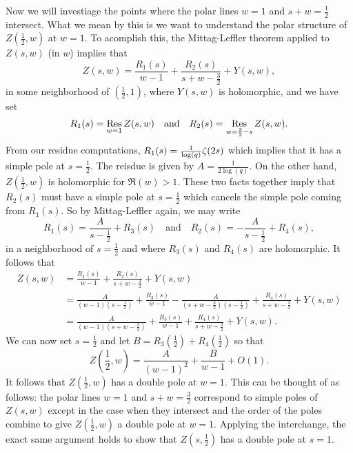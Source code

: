 \documentclass[12pt,reqno,oneside]{amsart}
\begin{document}
    Now we will investiage the points where the polar lines $w = 1$ and $s+w = \frac{1}{2}$ intersect. What we mean by this is we want to understand the polar structure of $Z\left(\frac{1}{2},w\right)$ at $w = 1$. To acomplish this, the Mittag-Leffler theorem applied to $Z(s,w)$ (in $w$) implies that
    \[
        Z(s,w) = \frac{R_{1}(s)}{w-1}+\frac{R_{2}(s)}{s+w-\frac{3}{2}}+Y(s,w),
    \]
    in some neighborhood of $\left(\frac{1}{2},1\right)$, where $Y(s,w)$ is holomorphic, and we have set
    \[
        R_{1}(s) = \operatorname*{\mathrm{Res}}_{w = 1}Z(s,w) \quad \text{and} \quad R_{2}(s) = \operatorname*{\mathrm{Res}}_{w = \frac{3}{2}-s}Z(s,w).
    \]
    From our residue computations, $R_{1}(s) = \frac{1}{\log(q)}\zeta(2s)$ which implies that it has a simple pole at $s = \frac{1}{2}$. The reisdue is given by $A = \frac{1}{2\log(q)}$. On the other hand, $Z\left(\frac{1}{2},w\right)$ is holomorphic for $\Re(w) > 1$. These two facts together imply that $R_{2}(s)$ must have a simple pole at $s = \frac{1}{2}$ which cancels the simple pole coming from $R_{1}(s)$. So by Mittag-Leffler again, we may write
    \[
        R_{1}(s) = \frac{A}{s-\frac{1}{2}}+R_{3}(s) \quad \text{and} \quad R_{2}(s) = -\frac{A}{s-\frac{1}{2}}+R_{4}(s),
    \]
    in a neighborhood of $s = \frac{1}{2}$ and where $R_{3}(s)$ and $R_{4}(s)$ are holomorphic. It follows that
    \begin{align*}
        Z(s,w) &= \frac{R_{1}(s)}{w-1}+\frac{R_{2}(s)}{s+w-\frac{3}{2}}+Y(s,w) \\ 
        &= \frac{A}{(w-1)\left(s-\frac{1}{2}\right)}+\frac{R_{3}(s)}{w-1}-\frac{A}{\left(s+w-\frac{3}{2}\right)\left(s-\frac{1}{2}\right)}+\frac{R_{4}(s)}{s+w-\frac{3}{2}}+Y(s,w) \\
        &= \frac{A}{(w-1)\left(s+w-\frac{3}{2}\right)}+\frac{R_{3}(s)}{w-1}+\frac{R_{4}(s)}{s+w-\frac{3}{2}}+Y(s,w).
    \end{align*}
    We can now set $s = \frac{1}{2}$ and let $B = R_{3}\left(\frac{1}{2}\right)+R_{4}\left(\frac{1}{2}\right)$ so that
    \[
        Z\left(\frac{1}{2},w\right) = \frac{A}{(w-1)^{2}}+\frac{B}{w-1}+O(1).
    \]
    It follows that $Z\left(\frac{1}{2},w\right)$ has a double pole at $w = 1$. This can be thought of as follows: the polar lines $w = 1$ and $s+w = \frac{3}{2}$ correspond to simple poles of $Z(s,w)$ except in the case when they intersect and the order of the poles combine to give $Z\left(\frac{1}{2},w\right)$ a double pole at $w = 1$. Applying the interchange, the exact same argument holds to show that $Z(s,\frac{1}{2})$ has a double pole at $s = 1$.
\end{document}
